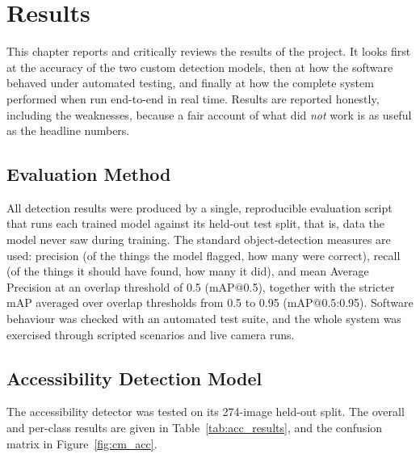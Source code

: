 \chapter{Results}
\label{ch:results}

This chapter reports and critically reviews the results of the project. It looks first at the accuracy of the two custom detection models, then at how the software behaved under automated testing, and finally at how the complete system performed when run end-to-end in real time. Results are reported honestly, including the weaknesses, because a fair account of what did \emph{not} work is as useful as the headline numbers.

\section{Evaluation Method}

All detection results were produced by a single, reproducible evaluation script that runs each trained model against its held-out test split, that is, data the model never saw during training. The standard object-detection measures are used: precision (of the things the model flagged, how many were correct), recall (of the things it should have found, how many it did), and mean Average Precision at an overlap threshold of 0.5 (mAP@0.5), together with the stricter mAP averaged over overlap thresholds from 0.5 to 0.95 (mAP@0.5:0.95). Software behaviour was checked with an automated test suite, and the whole system was exercised through scripted scenarios and live camera runs.

\section{Accessibility Detection Model}

The accessibility detector was tested on its 274-image held-out split. The overall and per-class results are given in Table~\ref{tab:acc_results}, and the confusion matrix in Figure~\ref{fig:cm_acc}.

